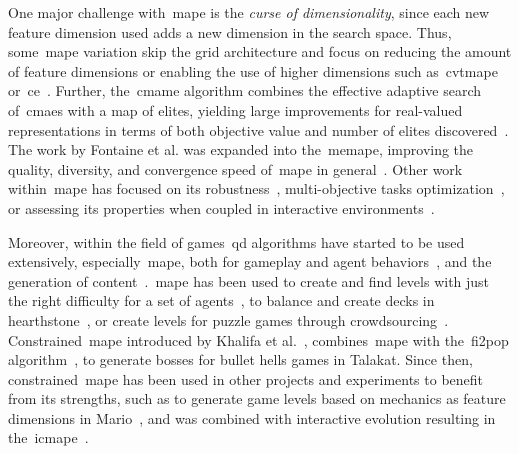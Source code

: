 One major challenge with~\acrshort{mape} is the \emph{curse of dimensionality}, since each new feature dimension used adds a new dimension in the search space. Thus, some~\acrshort{mape} variation skip the grid architecture and focus on reducing the amount of feature dimensions or enabling the use of higher dimensions such as~\acrlong{cvtmape}~\cite{vassiliades_using_2018} or~\acrlong{ce}~\cite{vassiliades_comparison_2017}. Further, the~\acrlong{cmame} algorithm combines the effective adaptive search of~\acrlong{cmaes} with a map of elites, yielding large improvements for real-valued representations in terms of both objective value and number of elites discovered~\cite{fontaine_covariance_2019}. The work by Fontaine et al. was expanded into the~\acrlong{memape}, improving the quality, diversity, and convergence speed of~\acrshort{mape} in general~\cite{cully_multi-emitter_2021}. Other work within~\acrshort{mape} has focused on its robustness~\cite{justesen_map-elites_2019}, multi-objective tasks optimization~\cite{pierrot_multi-objective_2022}, or assessing its properties when coupled in interactive environments~\cite{alvarez_assessing_2021}.


Moreover, within the field of games~\acrshort{qd} algorithms have started to be used extensively, especially~\acrshort{mape}, both for gameplay and agent behaviors~\cite{perez-liebana_generating_2021,zhang_deep_2022}, and the generation of content~\cite{gravina_procedural_2019}.~\acrshort{mape} has been used to create and find levels with just the right difficulty for a set of agents~\cite{gonzalez-duque_finding_2020}, to balance and create decks in hearthstone~\cite{fontaine_mapping_2019}, or create levels for puzzle games through crowdsourcing~\cite{charity_baba_2022}. Constrained~\acrshort{mape} introduced by Khalifa et al.~\cite{khalifa_talakat_2018}, combines~\acrshort{mape} with the~\acrfull{fi2pop} algorithm~\cite{kimbrough_feasibleinfeasible_2008}, to generate bosses for bullet hells games in Talakat. Since then, constrained~\acrshort{mape} has been used in other projects and experiments to benefit from its strengths, such as to generate game levels based on mechanics as feature dimensions in Mario~\cite{khalifa_intentional_2019,charity_mech-elites_2020}, and was combined with interactive evolution resulting in the~\acrlong{icmape}~\cite{alvarez_empowering_2019,alvarez_interactive_2020}. 



